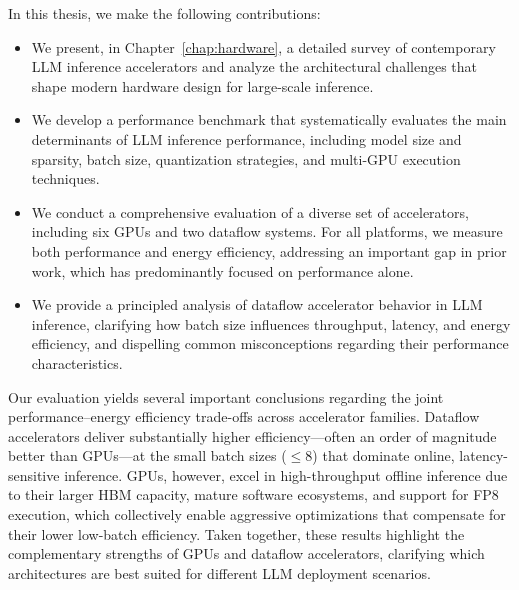 
In this thesis, we make the following contributions:

\begin{itemize}
    \item We present, in Chapter~\ref{chap:hardware}, a detailed survey of contemporary LLM inference accelerators and analyze the architectural challenges that shape modern hardware design for large-scale inference.

    \item We develop a performance benchmark that systematically evaluates the main determinants of LLM inference performance, including model size and sparsity, batch size, quantization strategies, and multi-GPU execution techniques.

    \item We conduct a comprehensive evaluation of a diverse set of accelerators, including six GPUs and two dataflow systems. For all platforms, we measure both performance and energy efficiency, addressing an important gap in prior work, which has predominantly focused on performance alone.

    \item We provide a principled analysis of dataflow accelerator behavior in LLM inference, clarifying how batch size influences throughput, latency, and energy efficiency, and dispelling common misconceptions regarding their performance characteristics.
\end{itemize}

Our evaluation yields several important conclusions regarding the joint performance–energy efficiency trade-offs across accelerator families. Dataflow accelerators deliver substantially higher efficiency—often an order of magnitude better than GPUs—at the small batch sizes ($\le 8$) that dominate online, latency-sensitive inference. GPUs, however, excel in high-throughput offline inference due to their larger HBM capacity, mature software ecosystems, and support for FP8 execution, which collectively enable aggressive optimizations that compensate for their lower low-batch efficiency. Taken together, these results highlight the complementary strengths of GPUs and dataflow accelerators, clarifying which architectures are best suited for different LLM deployment scenarios.